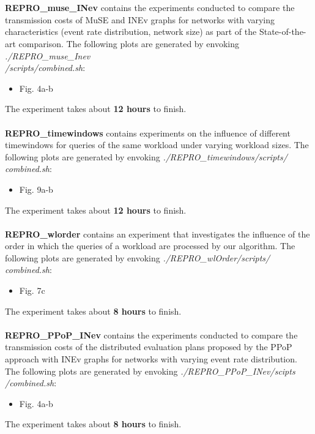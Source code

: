 \documentclass{article}
\begin{document}
\\
\\
\textbf{REPRO\_muse\_INev} contains the experiments conducted to compare the transmission costs of MuSE and INEv graphs for networks with varying characteristics (event rate distribution, network size) as part of the State-of-the-art comparison. The following plots are generated by envoking  \textit{./REPRO\_muse\_Inev\\/scripts/combined.sh}:
\begin{itemize}
\item Fig. 4a-b
\end{itemize}
The experiment takes about \textbf{12 hours} to finish.
\\
\\
\textbf{REPRO\_timewindows} contains experiments on the influence of different timewindows for queries of the same workload under varying workload sizes.
The following plots are generated by envoking \textit{./REPRO\_timewindows/scripts/\\combined.sh}:
\begin{itemize}
\item Fig. 9a-b
\end{itemize}
The experiment takes about \textbf{12 hours} to finish.
\\
\\
\textbf{REPRO\_wlorder} contains an experiment that investigates the influence of the order in which the queries of a workload are processed by our algorithm. The following plots are generated by envoking \textit{./REPRO\_wlOrder/scripts/\\combined.sh}:
\begin{itemize}
\item Fig. 7c
\end{itemize}
The experiment takes about \textbf{8 hours} to finish.
\\
\\
\textbf{REPRO\_PPoP\_INev} contains the experiments conducted to compare the transmission costs of the distributed evaluation plans proposed by the PPoP approach with INEv graphs for networks with varying event rate distribution.
The following plots are generated by envoking \textit{./REPRO\_PPoP\_INev/scipts\\/combined.sh}:
\begin{itemize}
\item Fig. 4a-b
\end{itemize}
The experiment takes about \textbf{8 hours} to finish.
\\
\end{document}
